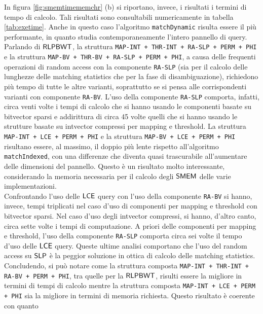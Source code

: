 In figura \ref{fig:smemtimememchr} (b) si riportano, invece, i risultati i
termini di tempo di calcolo. Tali risultati sono
consultabili numericamente in tabella \ref{tab:exetime}. Anche in questo caso
l'algoritmo 
\texttt{matchDynamic} risulta essere il più performante, in quanto studia
contemporaneamente l'intero pannello di query. Parlando di $\mbox{\rm {\sf RLPBWT}}$,  la
struttura \texttt{MAP-INT + THR-INT + RA-SLP + PERM + PHI} e la 
struttura 
\texttt{MAP-BV + THR-BV + RA-SLP + PERM + PHI}, a causa delle
frequenti operazioni di random access con la componente
\texttt{RA-SLP} (sia per il calcolo delle lunghezze delle 
matching statistics che per la fase di disambiguazione), richiedono più tempo
di tutte le altre varianti, soprattutto se si pensa alle corrispondenti
varianti con componente \texttt{RA-BV}. L'uso della componente \texttt{RA-SLP}
comporta, infatti, circa venti volte i tempi di calcolo che si hanno usando le
componenti 
basate su
bitvector sparsi e addirittura di circa 45 volte quelli che si hanno usando
le strutture basate su intvector compressi per mapping e threshold. La struttura
\texttt{MAP-INT + LCE + 
  PERM + PHI} e la struttura 
\texttt{MAP-BV + LCE + PERM + PHI} risultano essere, al massimo,
il doppio più lente rispetto all'algoritmo \texttt{matchIndexed}, con una
differenze che diventa quasi trascurabile all'aumentare delle dimensioni del
pannello. Questo è un 
risultato molto interessante, considerando la memoria necessaria
per il calcolo degli $\mbox{\rm {\sf SMEM}}$ delle varie implementazioni.\\
Confrontando l'uso delle $\mbox{\rm {\sf LCE}}$ query con l'uso della componente
\texttt{RA-BV} si hanno, invece, tempi triplicati nel caso d'uso di componenti
per mapping e 
threshold con bitvector sparsi. Nel caso d'uso degli intvector compressi, si
hanno, d'altro canto, circa sette volte i tempi di 
computazione. A priori delle componenti per mapping e
threshold, l'uso della componente \texttt{RA-SLP} comporta circa sei
volte il tempo d'uso delle $\mbox{\rm {\sf LCE}}$ query. Queste ultime analisi comportano
che l'uso del random access su $\mbox{\rm {\sf SLP}}$ è la peggior soluzione in
ottica di calcolo delle matching statistics.\\
Concludendo, si può notare come la struttura composta
\texttt{MAP-INT + THR-INT + RA-BV + PERM + PHI}, tra quelle per la
$\mbox{\rm {\sf RLPBWT}}$, risulti essere la migliore in termini di tempi di calcolo
mentre la struttura composta \texttt{MAP-INT + LCE + PERM + PHI} sia la
migliore in termini di memoria richiesta. Questo risultato è coerente con quanto
